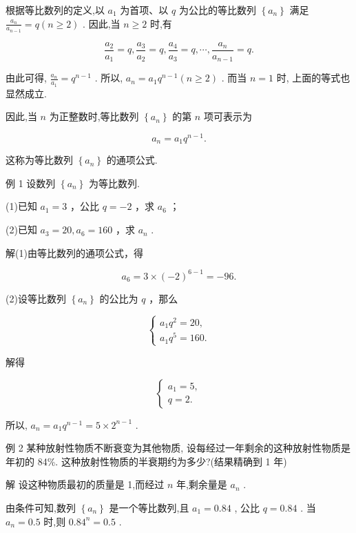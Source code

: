 \documentclass[10pt]{article}
\begin{document}
根据等比数列的定义,以 \({a}_{1}\) 为首项、以 \(q\) 为公比的等比数列 \(\left\{  {a}_{n}\right\}\) 满足 \(\frac{{a}_{n}}{{a}_{n - 1}} = q\left( {n \geq  2}\right)\) . 因此,当 \(n \geq  2\) 时,有

\[
\frac{{a}_{2}}{{a}_{1}} = q,\frac{{a}_{3}}{{a}_{2}} = q,\frac{{a}_{4}}{{a}_{3}} = q,\cdots ,\frac{{a}_{n}}{{a}_{n - 1}} = q.
\]

由此可得, \(\frac{{a}_{n}}{{a}_{1}} = {q}^{n - 1}\) . 所以, \({a}_{n} = {a}_{1}{q}^{n - 1}\left( {n \geq  2}\right)\) . 而当 \(n = 1\) 时, 上面的等式也显然成立.

因此,当 \(n\) 为正整数时,等比数列 \(\left\{  {a}_{n}\right\}\) 的第 \(n\) 项可表示为

\[
{a}_{n} = {a}_{1}{q}^{n - 1}.
\]

这称为等比数列 \(\left\{  {a}_{n}\right\}\) 的通项公式.

例 1 设数列 \(\left\{  {a}_{n}\right\}\) 为等比数列.

(1)已知 \({a}_{1} = 3\) ，公比 \(q =  - 2\) ，求 \({a}_{6}\) ；

(2)已知 \({a}_{3} = {20},{a}_{6} = {160}\) ，求 \({a}_{n}\) .

解(1)由等比数列的通项公式，得

\[
{a}_{6} = 3 \times  {\left( -2\right) }^{6 - 1} =  - {96}.
\]

(2)设等比数列 \(\left\{  {a}_{n}\right\}\) 的公比为 \(q\) ，那么

\[
\left\{  \begin{array}{l} {a}_{1}{q}^{2} = {20}, \\  {a}_{1}{q}^{5} = {160}. \end{array}\right.
\]

解得

\[
\left\{  \begin{array}{l} {a}_{1} = 5, \\  q = 2. \end{array}\right.
\]

所以, \({a}_{n} = {a}_{1}{q}^{n - 1} = 5 \times  {2}^{n - 1}\) .

例 2 某种放射性物质不断衰变为其他物质, 设每经过一年剩余的这种放射性物质是年初的 84\%. 这种放射性物质的半衰期约为多少?(结果精确到 1 年)

解 设这种物质最初的质量是 1,而经过 \(n\) 年,剩余量是 \({a}_{n}\) .

由条件可知,数列 \(\left\{  {a}_{n}\right\}\) 是一个等比数列,且 \({a}_{1} = {0.84}\) , 公比 \(q = {0.84}\) . 当 \({a}_{n} = {0.5}\) 时,则 \({0.84}^{n} = {0.5}\) .
\end{document}
